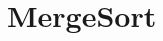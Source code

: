 \chapter{Merge\+Sort}
\hypertarget{md__r_e_a_d_m_e}{}\label{md__r_e_a_d_m_e}
\label{md__r_e_a_d_m_e_autotoc_md20}%
%

